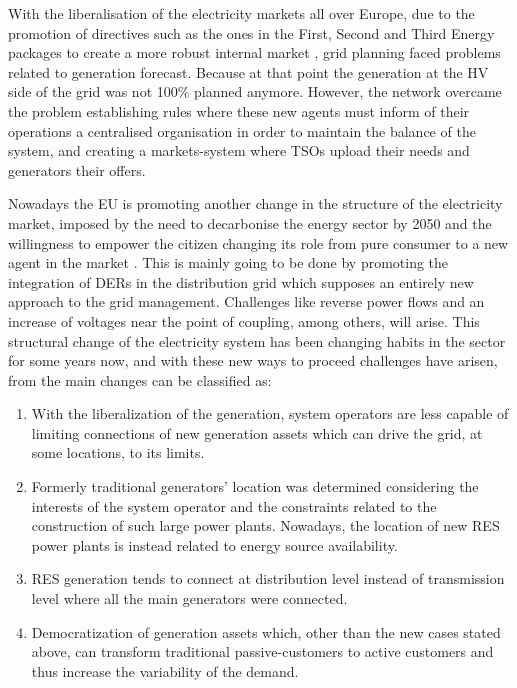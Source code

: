 With the liberalisation of the electricity markets all over Europe, due to the promotion of directives such as the ones in the First, Second and Third Energy packages \cite{EuropeanCommission2003, EuropeanCommission2009} to create a more robust internal market \cite{Hancher2017, EUPHEMIA2016, antonopoulos2020nodal}, grid planning faced problems related to generation forecast. Because at that point the generation at the HV side of the grid was not 100$\%$ planned anymore. However, the network overcame the problem establishing rules where these new agents must inform of their operations a centralised organisation in order to maintain the balance of the system, and creating a markets-system where TSOs upload their needs and generators their offers. 

Nowadays the EU is promoting another change in the structure of the electricity market, imposed by the need to decarbonise the energy sector by 2050 and the willingness to empower the citizen changing its role from pure consumer to a new agent in the market \cite{Hancher2017}. This is mainly going to be done by promoting the integration of DERs in the distribution grid which supposes an entirely new approach to the grid management. Challenges like reverse power flows and an increase of voltages near the point of coupling, among others, will arise. This structural change of the electricity system has been changing habits in the sector for some years now, and with these new ways to proceed challenges have arisen, from \cite{Bollen2011} the main changes can be classified as:

\begin{enumerate}
\item With the liberalization of the generation, system operators are less capable of limiting
connections of new generation assets which can drive the grid, at some locations, to its
limits.
\item Formerly traditional generators' location was determined considering the interests of the system
operator and the constraints related to the construction of such large power plants.
Nowadays, the location of new RES power plants is instead related to energy source availability.
\item RES generation tends to connect at distribution level instead of transmission level where
all the main generators were connected.
\item Democratization of generation assets which, other than the new cases stated above, can
transform traditional passive-customers to active customers and thus increase the variability
of the demand.

\end{enumerate}

